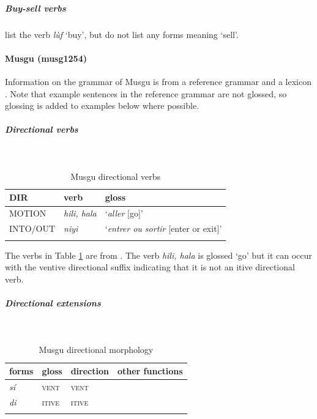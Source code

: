 \subparagraph{Buy-sell verbs}

\citet{tourneuxMbaraLeurLangue1986} list the verb \textit{lùf} `buy', but do not list any forms meaning `sell'. 

\paragraph*{Musgu (musg1254)} \label{musg}

Information on the grammar of Musgu is from a reference grammar \citep{meyer-bahlburgStudienZurMorphologie1972} and a lexicon \citep{tourneuxLexiquePratiqueMunjuk1991}. Note that example sentences in the reference grammar are not glossed, so glossing is added to examples below where possible.

\subparagraph{Directional verbs}~

\begin{table}[H]
	\caption{Musgu directional verbs} 
	\label{tab:musgV}
	\begin{tabular}{lll} %
		\lsptoprule
		DIR & verb & gloss   \\ %
		\midrule
		MOTION & \textit{hili, hala} & `\textit{aller} [go]' \\
		INTO/OUT & \textit{niyi} & `\textit{entrer ou sortir} [enter or exit]' \\
		\lspbottomrule
	\end{tabular}
\end{table}

The verbs in Table \ref{tab:musgV} are from \citet{tourneuxLexiquePratiqueMunjuk1991}. The verb \textit{hili, hala} is glossed `go' but it can occur with the ventive directional suffix indicating that it is not an itive directional verb. 

\subparagraph{Directional extensions}~

\begin{table}[H]
	\caption{Musgu directional morphology}
	\label{tab:musg}
	\begin{tabular}{llll} %
		\lsptoprule
		forms &  gloss & direction  & other functions  \\ %
		\midrule
		\textit{sí}  &  \textsc{vent}  &  \textsc{vent} &     \\
		\textit{di}  &  \textsc{itive}  & \textsc{itive}   &    \\
		\lspbottomrule
	\end{tabular}
\end{table} 

